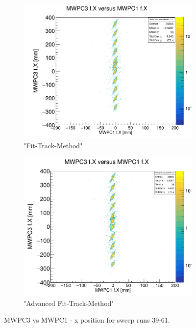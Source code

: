 \documentclass[12pt, letterpaper]{article}
\begin{document}
\begin{figure}[!htbp]
\begin{subfigure}{.5\textwidth}
\end{subfigure}
\begin{subfigure}{.5\textwidth}
  \centering
  \includegraphics[width=.9\linewidth]{plot_imgs/mw3_mw1_fit.png} 
  \caption{"Fit-Track-Method"}
  \label{fig:sub-second}
\end{subfigure}
\begin{subfigure}{.5\textwidth}
  \centering
  \includegraphics[width=.9\linewidth]{plot_imgs/mw3_mw1_alpha.png} 
  \caption{"Advanced Fit-Track-Method"}
  \label{fig:sub-second}
\end{subfigure}
\caption{MWPC3 vs MWPC1 - x position for sweep runs 39-61.}
\label{fig:fig}
\end{figure}
\FloatBarrier
\clearpage
\end{document}
